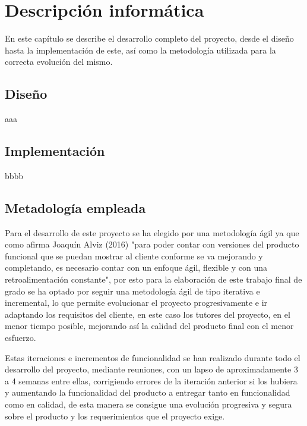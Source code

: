 
\chapter{Descripción informática} %

\label{Chapter4} %


En este capítulo se describe el desarrollo completo del proyecto, desde el diseño  hasta la implementación de este, así como la metodología utilizada para la correcta evolución del mismo.

\section{Diseño}
aaa

\section{Implementación}
bbbb

\section{Metadología empleada}
Para el desarrollo de este proyecto se ha elegido por una metodología ágil ya que como afirma Joaquín Alviz (2016) \cite{Reference1} "para poder contar con versiones del producto funcional que se puedan mostrar al cliente conforme se va mejorando y completando, es necesario contar con un enfoque ágil, flexible y con una retroalimentación constante", por esto para la elaboración de este trabajo final de grado se ha optado por seguir una metodología ágil de tipo iterativa e incremental, lo que permite evolucionar el proyecto progresivamente e ir adaptando los requisitos del cliente, en este caso los tutores del proyecto, en el menor tiempo posible, mejorando así la calidad del producto final con el menor esfuerzo.

Estas iteraciones e incrementos de funcionalidad se han realizado durante todo el desarrollo del proyecto, mediante reuniones, con un lapso de aproximadamente 3 a 4 semanas entre ellas, corrigiendo errores de la iteración anterior si los hubiera y aumentando la funcionalidad del producto a entregar tanto en funcionalidad como en calidad, de esta manera se consigue una evolución progresiva y segura sobre el producto y los requerimientos que el proyecto exige.

